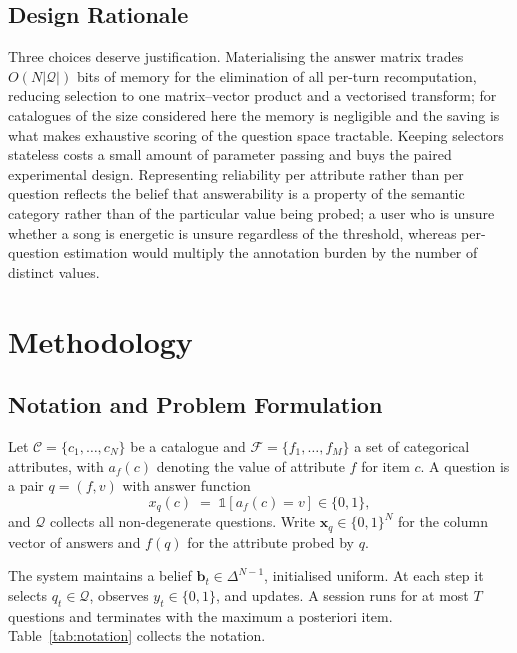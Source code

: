 \documentclass[conference]{IEEEtran}
\newcommand{\bx}{\mathbf{x}}
\newcommand{\bb}{\mathbf{b}}
\newcommand{\Cat}{\mathcal{C}}
\newcommand{\Qset}{\mathcal{Q}}
\newcommand{\Fset}{\mathcal{F}}
\begin{document}
\subsection{Design Rationale}

Three choices deserve justification. Materialising the answer matrix trades
$O(N|\Qset|)$ bits of memory for the elimination of all per-turn recomputation,
reducing selection to one matrix--vector product and a vectorised transform;
for catalogues of the size considered here the memory is negligible and the
saving is what makes exhaustive scoring of the question space tractable.
Keeping selectors stateless costs a small amount of parameter passing and buys
the paired experimental design. Representing reliability per attribute rather
than per question reflects the belief that answerability is a property of the
semantic category rather than of the particular value being probed; a user who
is unsure whether a song is energetic is unsure regardless of the threshold,
whereas per-question estimation would multiply the annotation burden by the
number of distinct values.

\section{Methodology}
\label{sec:method}

\subsection{Notation and Problem Formulation}

Let $\Cat = \{c_1,\dots,c_N\}$ be a catalogue and
$\Fset = \{f_1,\dots,f_M\}$ a set of categorical attributes, with $a_f(c)$
denoting the value of attribute $f$ for item $c$. A question is a pair
$q=(f,v)$ with answer function
\begin{equation}
x_q(c) \;=\; \mathbb{1}\!\left[a_f(c)=v\right] \in \{0,1\},
\end{equation}
and $\Qset$ collects all non-degenerate questions. Write $\bx_q \in \{0,1\}^N$
for the column vector of answers and $f(q)$ for the attribute probed by $q$.

The system maintains a belief $\bb_t \in \Delta^{N-1}$, initialised uniform. At
each step it selects $q_t \in \Qset$, observes $y_t \in \{0,1\}$, and updates.
A session runs for at most $T$ questions and terminates with the maximum a
posteriori item. Table~\ref{tab:notation} collects the notation.
\end{document}

